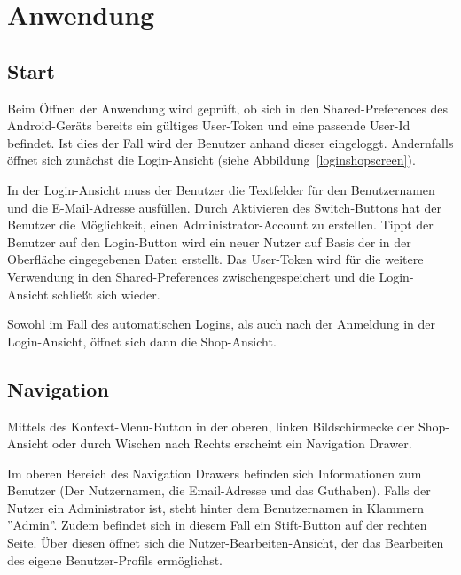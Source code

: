 \section{Anwendung}\label{sec:features}

\subsection{Start}\label{subsec:start}

Beim Öffnen der Anwendung wird geprüft, ob sich in den Shared-Preferences des Android-Geräts bereits ein gültiges User-Token und eine passende User-Id befindet.
Ist dies der Fall wird der Benutzer anhand dieser eingeloggt.
Andernfalls öffnet sich zunächst die Login-Ansicht (siehe Abbildung~\ref{loginshopscreen}).

In der Login-Ansicht muss der Benutzer die Textfelder für den Benutzernamen und die E-Mail-Adresse ausfüllen.
Durch Aktivieren des Switch-Buttons hat der Benutzer die Möglichkeit, einen Administrator-Account zu erstellen.
Tippt der Benutzer auf den Login-Button wird ein neuer Nutzer auf Basis der in der Oberfläche eingegebenen Daten erstellt.
Das User-Token wird für die weitere Verwendung in den Shared-Preferences zwischengespeichert und die Login-Ansicht schließt sich wieder.

Sowohl im Fall des automatischen Logins, als auch nach der Anmeldung in der Login-Ansicht, öffnet sich dann die Shop-Ansicht.


\subsection{Navigation} \label{subsec:navigation}

Mittels des Kontext-Menu-Button in der oberen, linken Bildschirmecke der Shop-Ansicht oder durch Wischen nach Rechts erscheint ein Navigation Drawer.

Im oberen Bereich des Navigation Drawers befinden sich Informationen zum Benutzer (Der Nutzernamen, die Email-Adresse und das Guthaben).
Falls der Nutzer ein Administrator ist, steht hinter dem Benutzernamen in Klammern ''Admin''.
Zudem befindet sich in diesem Fall ein Stift-Button auf der rechten Seite.
Über diesen öffnet sich die Nutzer-Bearbeiten-Ansicht, der das Bearbeiten des eigene Benutzer-Profils ermöglichst.

